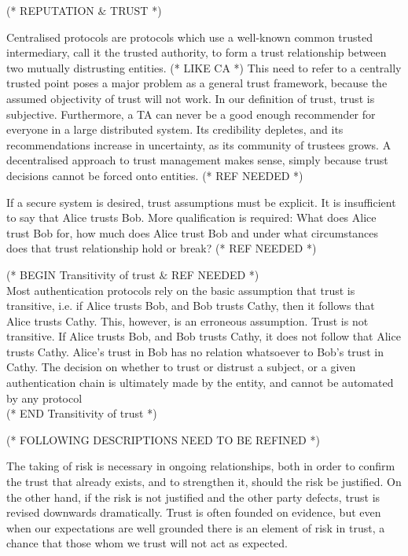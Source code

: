 \documentclass{article}
\begin{document}
(* REPUTATION $\&$ TRUST *)



Centralised protocols are protocols which use a well-known common trusted intermediary, call it the trusted authority, to form a trust relationship
between two mutually distrusting entities. (* LIKE CA *) This need to refer to a centrally trusted point poses a major problem as a general trust
framework, because the assumed objectivity of trust will not work. In our definition of trust, trust is subjective. Furthermore, a TA can never be
a good enough recommender for everyone in a large distributed system. Its credibility depletes, and its recommendations increase in uncertainty,
as its community of trustees grows. A decentralised approach to trust management makes sense, simply because trust decisions cannot be forced onto
entities. (* REF NEEDED *)



If a secure system is desired, trust assumptions must be explicit. It is insufficient to say that Alice trusts Bob. More qualification is required:
What does Alice trust Bob for, how much does Alice trust Bob and under what circumstances does that trust relationship hold or break? (* REF NEEDED
*)



(* BEGIN Transitivity of trust $\&$ REF NEEDED *)\\
Most authentication protocols rely on the basic assumption that trust is transitive, i.e. if Alice trusts Bob, and Bob trusts Cathy, then it follows
that Alice trusts Cathy. This, however, is an erroneous assumption. Trust is not transitive. If Alice trusts Bob, and Bob trusts Cathy, it does not
follow that Alice trusts Cathy. Alice's trust in Bob has no relation whatsoever to Bob's trust in Cathy. The decision on whether to trust or distrust
a subject, or a given authentication chain is ultimately made by the entity, and cannot be automated by any protocol\\
(* END Transitivity of trust *)



(* FOLLOWING DESCRIPTIONS NEED TO BE REFINED *)



The taking of risk is necessary in ongoing relationships, both in order to confirm the trust that already exists, and to strengthen it, should the
risk be justified. On the other hand, if the risk is not justified and the other party defects, trust is revised downwards dramatically. Trust is
often founded on evidence, but even when our expectations are well grounded there is an element of risk in trust, a chance that those whom we trust
will not act as expected.
\end{document}
